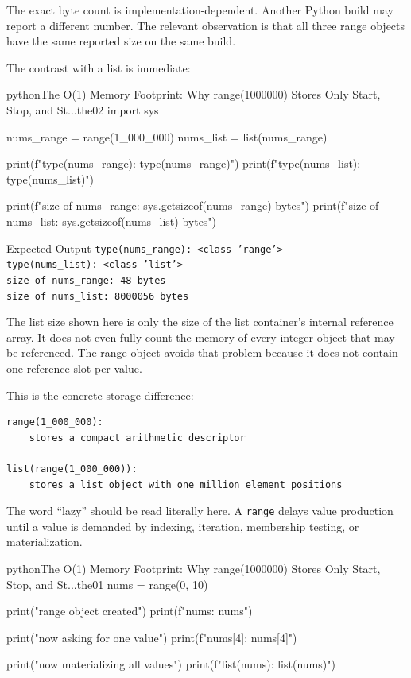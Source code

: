The exact byte count is implementation-dependent. Another Python build may report a different number. The relevant observation is that all three range objects have the same reported size on the same build.

The contrast with a list is immediate:

\begin{codebox}[]{python}{The O(1) Memory Footprint: Why range(1000000) Stores Only Start, Stop, and St...}{the02}
import sys

nums_range = range(1_000_000)
nums_list = list(nums_range)

print(f"type(nums_range): {type(nums_range)}")
print(f"type(nums_list): {type(nums_list)}")

print(f"size of nums_range: {sys.getsizeof(nums_range)} bytes")
print(f"size of nums_list:  {sys.getsizeof(nums_list)} bytes")
\end{codebox}


\begin{iobox}{Expected Output}
\texttt{type(nums\_range): <class 'range'>} \\
\texttt{type(nums\_list): <class 'list'>} \\
\texttt{size of nums\_range: 48 bytes} \\
\texttt{size of nums\_list:  8000056 bytes} \\
\end{iobox}


The list size shown here is only the size of the list container's internal reference array. It does not even fully count the memory of every integer object that may be referenced. The range object avoids that problem because it does not contain one reference slot per value.

This is the concrete storage difference:

\begin{verbatim}
range(1_000_000):
    stores a compact arithmetic descriptor

list(range(1_000_000)):
    stores a list object with one million element positions
\end{verbatim}

The word \enquote{lazy} should be read literally here. A \texttt{range} delays value production until a value is demanded by indexing, iteration, membership testing, or materialization.

\begin{codebox}[]{python}{The O(1) Memory Footprint: Why range(1000000) Stores Only Start, Stop, and St...}{the01}
nums = range(0, 10)

print("range object created")
print(f"nums: {nums}")

print("now asking for one value")
print(f"nums[4]: {nums[4]}")

print("now materializing all values")
print(f"list(nums): {list(nums)}")
\end{codebox}


